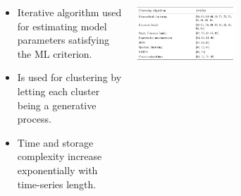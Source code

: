 \documentclass[18pt, a3paper, portrait]{tikzposter}
\begin{document}
\begin{columns}
\begin{subcolumns}
    {
        \begin{itemize}
            \item Iterative algorithm used for estimating model parameters satisfying the ML criterion.
            \item Is used for clustering by letting each cluster being a generative process.
            \item Time and storage complexity increase exponentially with time-series length.
        \end{itemize}
    }
    \end{subcolumns}
    {
        \begin{tikzfigure}
            \includegraphics[width=0.45\textwidth]{images/clustering_algorithms_table.png}
        \end{tikzfigure}
    }
\end{columns}
\end{document}
